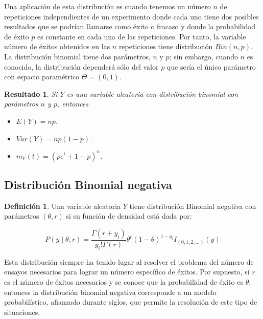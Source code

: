 \documentclass[
  10pt,
  spanish,
]{book}
\providecommand{\tightlist}{%
  \setlength{\itemsep}{0pt}\setlength{\parskip}{0pt}}
\newtheorem{proposition}{Resultado}[chapter]
\theoremstyle{definition}
\newtheorem{definition}{Definición}[chapter]
\theoremstyle{definition}
\theoremstyle{definition}
\theoremstyle{definition}
\theoremstyle{remark}
\begin{document}
Una aplicación de esta distribución es cuando tenemos un número \(n\) de repeticiones independientes de un experimento donde cada uno tiene dos
posibles resultados que se podrían llamarse como éxito o fracaso y donde la probabilidad de éxito \(p\) es constante en cada una de las repeticiones. Por tanto, la variable número de éxitos obtenidos en las \(n\) repeticiones tiene distribución \(Bin(n,p)\). La distribución binomial tiene dos parámetros, \(n\) y \(p\); sin embargo, cuando \(n\) es conocido, la distribución dependerá sólo del valor \(p\) que sería el único parámetro con espacio paramétrico \(\Theta=(0,1)\).

\begin{proposition}
\protect\hypertarget{prp:unnamed-chunk-10}{}{\label{prp:unnamed-chunk-10} }Si \(Y\) es una variable aleatoria con distribución binomial con parámetros \(n\) y \(p\), entonces

\begin{itemize}
\tightlist
\item
  \(E(Y)=np\).
\item
  \(Var(Y)=np(1-p)\).
\item
  \(m_Y(t)=(pe^t+1-p)^n\).
\end{itemize}
\end{proposition}

\hypertarget{distribuciuxf3n-binomial-negativa}{%
\subsection{Distribución Binomial negativa}\label{distribuciuxf3n-binomial-negativa}}

\begin{definition}
\protect\hypertarget{def:unnamed-chunk-11}{}{\label{def:unnamed-chunk-11} }Una variable aleatoria \(Y\) tiene distribución Binomial negativa con parámetros \((\theta, r)\) si su función de densidad está dada por:

\begin{equation}
P(y\mid \theta, r)=\frac{\Gamma(r+y_i)}{y_i!\Gamma(r)}\theta^r(1-\theta)^{1-y_i}I_{(0,1,2,\ldots)}(y)
\end{equation}
\end{definition}

Esta distribución siempre ha tenido lugar al resolver el problema del número de ensayos necesarios para lograr un número específico de éxitos. Por supuesto, si \(r\) es el número de éxitos necesarios y se conoce que la probabilidad de éxito es \(\theta\), entonces la distribución binomial negativa corresponde a un modelo probabilístico, afianzado durante siglos, que permite la resolución de este tipo de situaciones.
\end{document}
